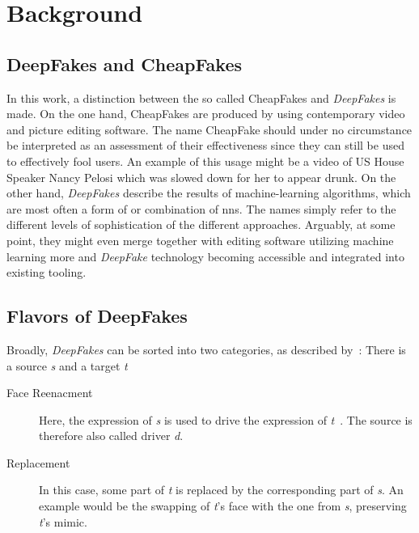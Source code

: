 \section{Background}\label{sect:background}

\subsection{DeepFakes and CheapFakes}
In this work, a distinction between the so called CheapFakes and \textit{DeepFakes}
is made. On the one hand, CheapFakes are produced by using contemporary video 
and picture editing software. The name CheapFake should under no circumstance be
interpreted as an assessment of their effectiveness since they can still be used
to effectively fool users. An example of this usage might be a video of US House
Speaker Nancy Pelosi which was slowed down for her to appear drunk.
On the other hand, \textit{DeepFakes} describe the results of machine-learning
algorithms, which are most often a form of or combination of \glspl{nn}.
The names simply refer to the different levels of sophistication of the different
approaches. Arguably, at some point, they might even merge together with editing 
software utilizing machine learning more and \textit{DeepFake} technology becoming
accessible and integrated into existing tooling.

\subsection{Flavors of DeepFakes}\label{subsubsect:deepfake-flavors}
Broadly, \textit{DeepFakes} can be sorted into two categories, as described by~\textcite{mirsky_creation_2020}:
There is a source \textit{s} and a target \textit{t}

\begin{description}
    \item[Face Reenacment] Here, the expression of \textit{s} is used to drive
    the expression of \textit{t}~\cite{mirsky_creation_2020}. The source is
    therefore also called driver \textit{d}.
    \item[Replacement] In this case, some part of \textit{t} is replaced
    by the corresponding part of \textit{s}. An example would be the swapping of
    \textit{t}'s face with the one from \textit{s}, preserving \textit{t}'s mimic.
\end{description}

